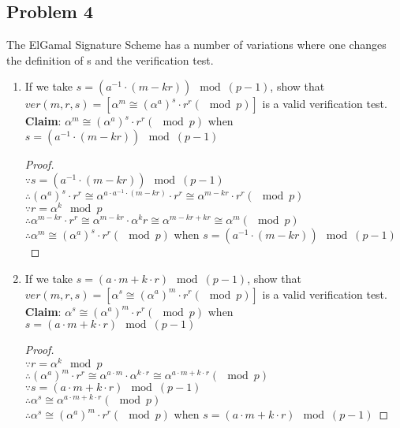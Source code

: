 \documentclass[paper=a4, fontsize=11pt]{scrartcl} %
\numberwithin{equation}{section} %
\numberwithin{figure}{section} %
\newcommand{\problem}[1]{\subsection *{Problem #1}}
\newcommand{\claim}{\textbf{Claim}: }
\newcommand{\pnl}{$ $\newline\\}
\begin{document}
\problem 4 
The ElGamal Signature Scheme has a number of variations where one changes the definition of s and the verification test.

\begin{enumerate}
\item If we take $s = ( a^{-1} \cdot (m-kr)) \mod (p-1)$, show that
$ver(m, r, s) = [\alpha^m \cong (\alpha^a)^s \cdot r^r (\mod p)]$ is a valid verification test.\\
\claim $\alpha^m \cong (\alpha^a)^s \cdot r^r (\mod p)$ when $s = ( a^{-1} \cdot (m-kr)) \mod (p-1)$
\begin{proof}
\pnl
$\because s = ( a^{-1} \cdot (m-kr)) \mod (p-1)$ \\
$\therefore (\alpha^a)^s \cdot r^r \cong \alpha^{a\cdot a^{-1} \cdot (m-kr)} \cdot r^r \cong \alpha^{m-kr} \cdot  r^r (\mod p)$\\
$\because r = \alpha^k \mod p$ \\
$\therefore \alpha^{m-kr} \cdot  r^r \cong \alpha^{m-kr} \cdot \alpha^kr \cong \alpha^{m-kr+kr} \cong \alpha^m (\mod p)$\\
$\therefore \alpha^m \cong (\alpha^a)^s \cdot r^r (\mod p)$ when $s = ( a^{-1} \cdot (m-kr)) \mod (p-1)$

\end{proof}

\item If we take $s = ( a\cdot m + k\cdot r) \mod (p-1)$, show that
$ver(m, r, s) = [\alpha^s \cong (\alpha^a)^m \cdot r^r (\mod p)]$ is a valid verification test.\\
\claim $\alpha^s \cong (\alpha^a)^m \cdot r^r (\mod p)$ when $s = ( a\cdot m + k\cdot r) \mod (p-1)$\\
\begin{proof}
\pnl
$\because r = \alpha^k \mod p$ \\
$\therefore (\alpha^a)^m \cdot r^r \cong \alpha^{a\cdot m} \cdot \alpha^{k\cdot r} \cong \alpha^{a\cdot m + k\cdot r} (\mod p) $\\
$\because s = ( a\cdot m + k\cdot r) \mod (p-1)$ \\
$\therefore \alpha^s \cong \alpha^{a\cdot m + k\cdot r} (\mod p)$\\
$\therefore \alpha^s \cong (\alpha^a)^m \cdot r^r (\mod p)$ when $s = ( a\cdot m + k\cdot r) \mod (p-1)$
\end{proof}


\end{enumerate}
\end{document}
